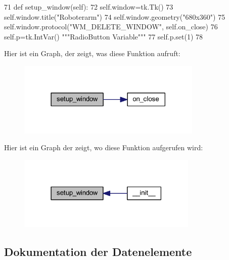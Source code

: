 \begin{DoxyCode}
71     \textcolor{keyword}{def }setup\_window(self):
72         self.window=tk.Tk()
73         self.window.title(\textcolor{stringliteral}{"Roboterarm"})
74         self.window.geometry(\textcolor{stringliteral}{"680x360"})
75         self.window.protocol(\textcolor{stringliteral}{"WM\_DELETE\_WINDOW"}, self.on\_close)
76         self.p=tk.IntVar()                                                      \textcolor{stringliteral}{"""RadioButton Variable"""}
77         self.p.set(1)
78 
\end{DoxyCode}
Hier ist ein Graph, der zeigt, was diese Funktion aufruft\+:
\nopagebreak
\begin{figure}[H]
\begin{center}
\leavevmode
\includegraphics[width=249pt]{class_f_i_n_a_l___g_u_i___w_l_a_n_1_1_w_l_a_n_a9fe79fb8dbee1e660dc971b137c55f3f_cgraph}
\end{center}
\end{figure}
Hier ist ein Graph der zeigt, wo diese Funktion aufgerufen wird\+:
\nopagebreak
\begin{figure}[H]
\begin{center}
\leavevmode
\includegraphics[width=243pt]{class_f_i_n_a_l___g_u_i___w_l_a_n_1_1_w_l_a_n_a9fe79fb8dbee1e660dc971b137c55f3f_icgraph}
\end{center}
\end{figure}


\subsection{Dokumentation der Datenelemente}
\mbox{\label{class_f_i_n_a_l___g_u_i___w_l_a_n_1_1_w_l_a_n_a4124bc0a9335c27f086f24ba207a4912}} 
